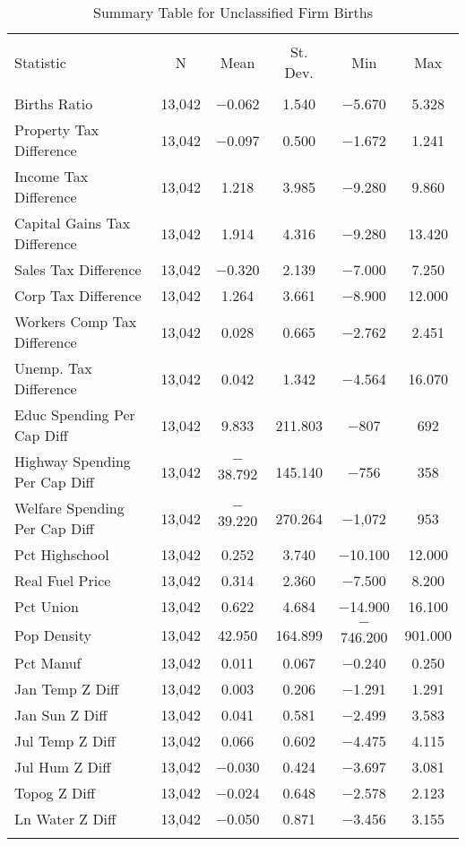 
\begin{table}[!htbp] \centering 
  \caption{Summary Table for  Unclassified Firm Births} 
  \label{99summary} 
\begin{tabular}{@{\extracolsep{5pt}}lccccc} 
\\[-1.8ex]\hline 
\hline \\[-1.8ex] 
Statistic & \multicolumn{1}{c}{N} & \multicolumn{1}{c}{Mean} & \multicolumn{1}{c}{St. Dev.} & \multicolumn{1}{c}{Min} & \multicolumn{1}{c}{Max} \\ 
\hline \\[-1.8ex] 
Births Ratio & 13,042 & $-$0.062 & 1.540 & $-$5.670 & 5.328 \\ 
Property Tax Difference & 13,042 & $-$0.097 & 0.500 & $-$1.672 & 1.241 \\ 
Income Tax Difference & 13,042 & 1.218 & 3.985 & $-$9.280 & 9.860 \\ 
Capital Gains Tax Difference & 13,042 & 1.914 & 4.316 & $-$9.280 & 13.420 \\ 
Sales Tax Difference & 13,042 & $-$0.320 & 2.139 & $-$7.000 & 7.250 \\ 
Corp Tax Difference & 13,042 & 1.264 & 3.661 & $-$8.900 & 12.000 \\ 
Workers Comp Tax Difference & 13,042 & 0.028 & 0.665 & $-$2.762 & 2.451 \\ 
Unemp. Tax Difference & 13,042 & 0.042 & 1.342 & $-$4.564 & 16.070 \\ 
Educ Spending Per Cap Diff & 13,042 & 9.833 & 211.803 & $-$807 & 692 \\ 
Highway Spending Per Cap Diff & 13,042 & $-$38.792 & 145.140 & $-$756 & 358 \\ 
Welfare Spending Per Cap Diff & 13,042 & $-$39.220 & 270.264 & $-$1,072 & 953 \\ 
Pct Highschool & 13,042 & 0.252 & 3.740 & $-$10.100 & 12.000 \\ 
Real Fuel Price & 13,042 & 0.314 & 2.360 & $-$7.500 & 8.200 \\ 
Pct Union & 13,042 & 0.622 & 4.684 & $-$14.900 & 16.100 \\ 
Pop Density & 13,042 & 42.950 & 164.899 & $-$746.200 & 901.000 \\ 
Pct Manuf & 13,042 & 0.011 & 0.067 & $-$0.240 & 0.250 \\ 
Jan Temp Z Diff & 13,042 & 0.003 & 0.206 & $-$1.291 & 1.291 \\ 
Jan Sun Z Diff & 13,042 & 0.041 & 0.581 & $-$2.499 & 3.583 \\ 
Jul Temp Z Diff & 13,042 & 0.066 & 0.602 & $-$4.475 & 4.115 \\ 
Jul Hum Z Diff & 13,042 & $-$0.030 & 0.424 & $-$3.697 & 3.081 \\ 
Topog Z Diff & 13,042 & $-$0.024 & 0.648 & $-$2.578 & 2.123 \\ 
Ln Water Z Diff & 13,042 & $-$0.050 & 0.871 & $-$3.456 & 3.155 \\ 
\hline \\[-1.8ex] 
\end{tabular} 
\end{table} 
